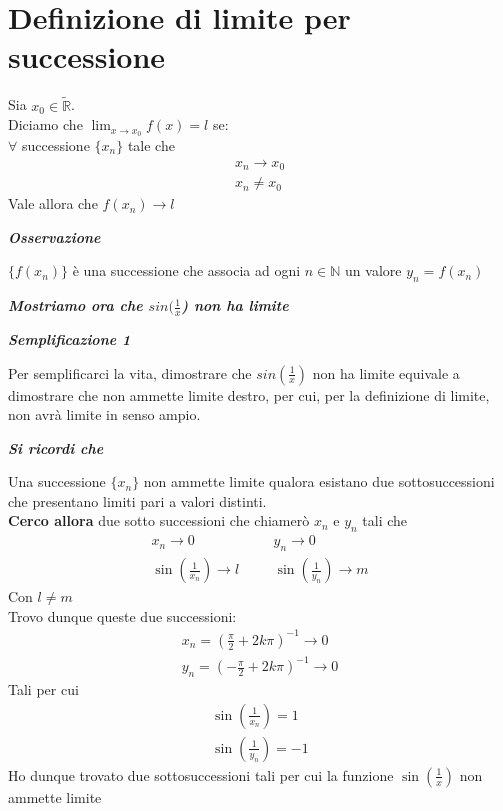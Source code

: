 \documentclass{article}
\theoremstyle{definition}
\begin{document}
\section{Definizione di limite per successione}
Sia $x_0 \in \tilde{\mathbb{R}}$.
\\
Diciamo che $\lim_{x \to x_0}f(x)=l$ se:
\\
$\forall$ successione $\{x_n\}$ tale che
\begin{align*}
    x_n \to x_0 \\
    x_n \neq x_0
\end{align*}
Vale allora che $f(x_n) \to l$
\begin{center}
    \textbf{\textit{Osservazione}}
\end{center}
$\{f(x_n)\}$ è una successione che associa ad ogni $n \in \mathbb{N}$ un valore $y_n=f(x_n)$
\begin{center}
    \textbf{\textit{Mostriamo ora che $sin(\frac{1}{x}$) non ha limite}}
\end{center}
\begin{center}
    \textbf{\textit{Semplificazione 1}}
\end{center}
Per semplificarci la vita, dimostrare che $sin(\frac{1}{x})$ non ha limite equivale a dimostrare che non ammette limite destro, per cui, per la definizione di limite, non avrà limite in senso ampio.
\begin{center}
    \textbf{\textit{Si ricordi che}}
\end{center}
Una successione $\{x_n\}$ non ammette limite qualora esistano due sottosuccessioni che presentano limiti pari a valori distinti.
\\
\textbf{Cerco allora} due sotto successioni che chiamerò $x_n$ e $y_n$ tali che 
\begin{align*}
    x_n \to 0 & \,\,\,\,\,\,\,\,\,\, y_n \to 0\\ 
    \sin(\frac{1}{x_n}) \to l & \,\,\,\,\,\,\,\,\,\,\sin(\frac{1}{y_n}) \to m
\end{align*}
Con $l \neq m$
\\
Trovo dunque queste due successioni:
\begin{align}
    x_n=\left(\frac{\pi}{2}+2k\pi\right)^{-1} \to 0 \\
    y_n=\left(-\frac{\pi}{2}+2k\pi\right)^{-1} \to 0
\end{align}
Tali per cui
\begin{align}
    \sin(\frac{1}{x_n})=1 \\
    \sin(\frac{1}{y_n})=-1
\end{align}
Ho dunque trovato due sottosuccessioni tali per cui la funzione $\sin(\frac{1}{x})$ non ammette limite
\newpage
\end{document}
